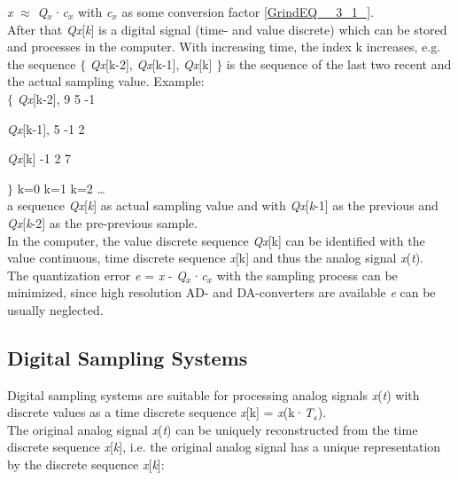 \textit{x} $\mathrm{\approx}$ \textit{Q${}_{x}$}·\textit{c${}_{x}$}       with \textit{c${}_{x}$} as some conversion factor  \eqref{GrindEQ__3_1_}.\\

After that \textit{Qx}[\textit{k}] is a digital signal (time- and value discrete) which can be stored and processes in the computer. With increasing time, the index k increases, e.g. the sequence $\mathrm{\{}$ \textit{Qx}[k-2], \textit{Qx}[k-1], \textit{Qx}[k] $\mathrm{\}}$ is the sequence of the last two recent and the actual sampling value. Example:\\

 $\mathrm{\{}$  \textit{Qx}[k-2],     9    5    -1

  \textit{Qx}[k-1],     5    -1    2

  \textit{Qx}[k]     -1    2    7

 $\mathrm{\}}$        k=0    k=1   k=2   {\dots}\\

a sequence \textit{Qx}[\textit{k}] as actual sampling value and with \textit{Qx}[\textit{k}-1] as the previous and \textit{Qx}[\textit{k}-2] as the pre-previous sample.\\

In the computer, the value discrete sequence \textit{Qx}[k] can be identified with the value continuous, time discrete sequence \textit{x}[k] and thus the analog signal \textit{x}(\textit{t}). \\

The quantization error \textit{e} = \textit{x} - \textit{Q${}_{x}$}·\textit{c${}_{x}$} with the sampling process can be minimized, since high resolution AD- and DA-converters are available   \textit{e} can be usually neglected.

\subsection{Digital Sampling Systems}

Digital sampling systems are suitable for processing analog signals \textit{x}(\textit{t}) with discrete values as a time discrete sequence \textit{x}[k] = \textit{x}(k·\textit{T${}_{s}$}). \\

The original analog signal \textit{x}(\textit{t}) can be uniquely reconstructed from the time discrete sequence \textit{x}[\textit{k}], i.e. the original analog signal has a unique representation by the discrete sequence \textit{x}[\textit{k}]:\\


